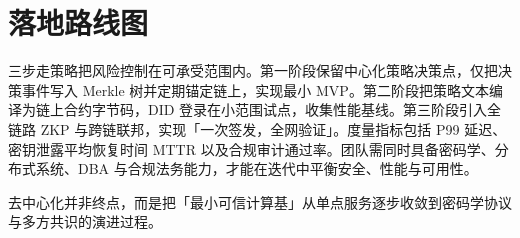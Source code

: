 \chapter{落地路线图}
三步走策略把风险控制在可承受范围内。第一阶段保留中心化策略决策点，仅把决策事件写入 Merkle 树并定期锚定链上，实现最小 MVP。第二阶段把策略文本编译为链上合约字节码，DID 登录在小范围试点，收集性能基线。第三阶段引入全链路 ZKP 与跨链联邦，实现「一次签发，全网验证」。度量指标包括 P99 延迟、密钥泄露平均恢复时间 MTTR 以及合规审计通过率。团队需同时具备密码学、分布式系统、DBA 与合规法务能力，才能在迭代中平衡安全、性能与可用性。\par
去中心化并非终点，而是把「最小可信计算基」从单点服务逐步收敛到密码学协议与多方共识的演进过程。\par
